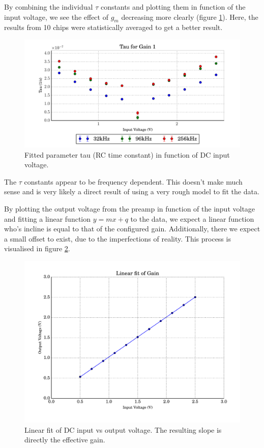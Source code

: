 By combining the individual $\tau$ constants and  plotting them in function of
the input voltage, we see the  effect of $g_m$ decreasing more clearly (figure
\ref{fig:tau}).  Here,  the  results from 10 chips were statistically averaged to get a better result.

\begin{figure}
    \centering
    \includegraphics[width=\linewidth]{images/plots/tau_results_1.pdf}
    \caption{Fitted parameter tau (RC time constant) in function of DC input voltage.}
    \label{fig:tau}
\end{figure}

The $\tau$ constants  appear to be frequency dependent. This doesn't make much
sense and is very likely a direct  result  of  using a very rough model to fit
the data.

By  plotting  the output voltage from the preamp  in  function  of  the  input
voltage and fitting a linear function $y=mx+q$ to the data, we expect a linear
function who's  incline is equal to that of the configured gain. Additionally,
there  we expect a small offset to exist, due to the imperfections of reality.
This  process  is  visualised  in  figure \ref{fig:linear_fit}.

\begin{figure}
    \centering
    \includegraphics[width=\linewidth]{images/plots/linear_fit.pdf}
    \caption{Linear fit of DC input vs output voltage. The resulting slope is directly the effective gain.}
    \label{fig:linear_fit}
\end{figure}

